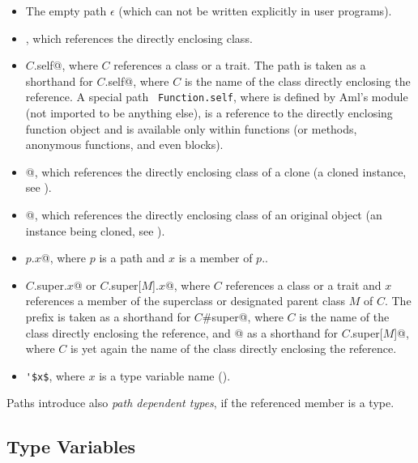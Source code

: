 \begin{itemize}
  \item The empty path $\epsilon$ (which can not be written explicitly in user programs). 

  \item {}, which references the directly enclosing class. 

  \item \lstinline@$C$.self@, where $C$ references a class or a trait. The path  is taken as a shorthand for \lstinline@$C$.self@, where $C$ is the name of the class directly enclosing the reference. A special path ~\lstinline!Function.self!, where  is defined by Aml's  module (not imported to be anything else), is a reference to the directly enclosing function object and is available only within functions (or methods, anonymous functions, and even blocks).

  \item \lstinline@self[cloned]@, which references the directly enclosing class of a clone (a cloned instance, see ). 

  \item \lstinline@self[origin]@, which references the directly enclosing class of an original object (an instance being cloned, see ). 

  \item \lstinline@$p$.$x$@, where $p$ is a path and $x$ is a member of $p$.. 

  \item \lstinline@$C$.super.$x$@ or \lstinline@$C$.super[$M$].$x$@, where $C$ references a class or a trait and $x$ references a member of the superclass or designated parent class $M$ of $C$. The prefix  is taken as a shorthand for \lstinline@$C$#super@, where $C$ is the name of the class directly enclosing the reference, and \lstinline@super[$M$]@ as a shorthand for \lstinline@$C$.super[$M$]@, where $C$ is yet again the name of the class directly enclosing the reference. 

  \item \lstinline!'$x$!, where $x$ is a type variable name ().
\end{itemize}

Paths introduce also {\em path dependent types}, if the referenced member is a type. 





\subsection{Type Variables}
\label{sec:type-variables}

